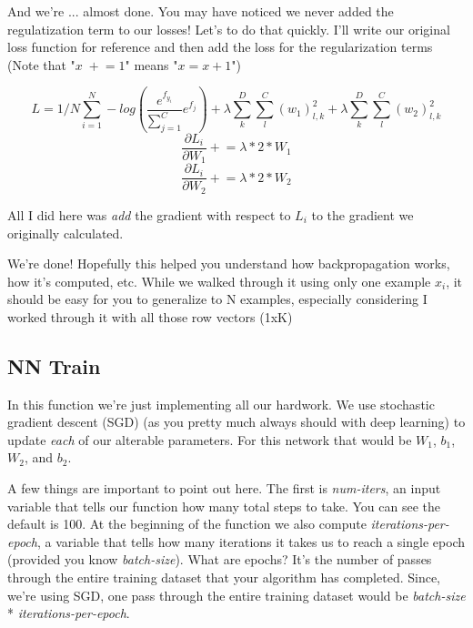 \documentclass[12pt]{article}
\begin{document}
And we're ... almost done. You may have noticed we never added the regulatization term to our losses! 
Let's to do that quickly. I'll write our original loss function for reference and then add the loss for 
the regularization terms (Note that "$x \; +\!= 1$" means "$x = x + 1$")

\begin{equation}
    L = 1/N \sum_{i=1}^N - log(\frac{e^{f_{y_i}}}{\sum_{j=1}^C} e^{f_j}) + 
    \lambda \sum_{k}^D \sum_{l}^C (w_1)_{l, k}^2 + 
    \lambda \sum_{k}^D \sum_{l}^C (w_2)_{l, k}^2
\end{equation}
\begin{equation}
    \frac{\partial L_i}{\partial W_1} +\!= \lambda * 2 * W_1
\end{equation}
\begin{equation}
    \frac{\partial L_i}{\partial W_2} +\!= \lambda * 2 * W_2
\end{equation}

All I did here was \emph{add} the gradient with respect to $L_i$ to the gradient we originally 
calculated. 

We're done! Hopefully this helped you understand how backpropagation works, how it's computed, 
etc. While we walked through it using only one example $x_i$, it should be easy for you to generalize 
to N examples, especially considering I worked through it with all those row vectors (1xK)

\subsection{NN Train}
In this function we're just implementing all our hardwork. We use stochastic gradient descent (SGD)
(as you pretty much always should with deep learning) to update \emph{each} of our alterable 
parameters. For this network that would be $W_1$, $b_1$, $W_2$, and $b_2$. 

A few things are important to point out here. The first is \emph{num-iters}, an input variable that
tells our function how many total steps to take. You can see the default is 100. At the beginning of
the function we also compute \emph{iterations-per-epoch}, a variable that tells how many iterations
it takes us to reach a single epoch (provided you know \emph{batch-size}). What are epochs? It's the number 
of passes through the entire training dataset that your algorithm has completed. Since, we're using SGD, 
one pass through the entire training dataset would be \emph{batch-size} * \emph{iterations-per-epoch}. 
\end{document}
